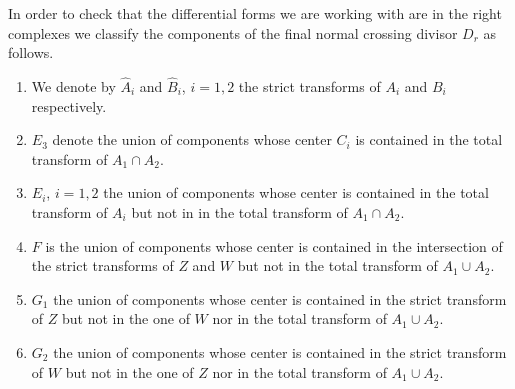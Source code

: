 \documentclass[11pt,a4paper]{amsart}
\numberwithin{equation}{section}
\theoremstyle{plain}
\theoremstyle{definition}
\begin{document}
In order to check that the differential forms we are working with are
in the right complexes we classify the components of the final normal
crossing divisor $D_r$ as follows. 

\begin{enumerate}
\item We denote by $\widehat A_{i}$ and $\widehat B_{i}$, $i=1,2$ the
strict transforms of $A_{i}$ and $B_{i}$ respectively. 

\item $E_{3}$ denote the union of components whose center $C_{i}$ is
  contained in the total transform of  $A_{1}\cap A_{2}$.
  
\item $E_{i}$, $i=1,2$  the union of components whose center is contained in
  the total transform of $A_{i}$ but not in in the total transform of $A_{1}\cap A_{2}$.
  
\item $F$ is the union of components whose center is contained in the
  intersection of the strict transforms of $Z$ and $W$ but not in  
  the total transform of $A_{1}\cup A_{2}$.
  
\item $G_{1}$ the union of components whose center is contained in the
  strict transform of $Z$ but not in the one of $W$ nor in the total
  transform of  $A_{1}\cup A_{2}$.
  
\item $G_{2}$ the union of components whose center is contained in the
  strict transform of $W$ but not in the one of $Z$ nor in the total
  transform of  $A_{1}\cup A_{2}$.
\end{enumerate}
\end{document}
